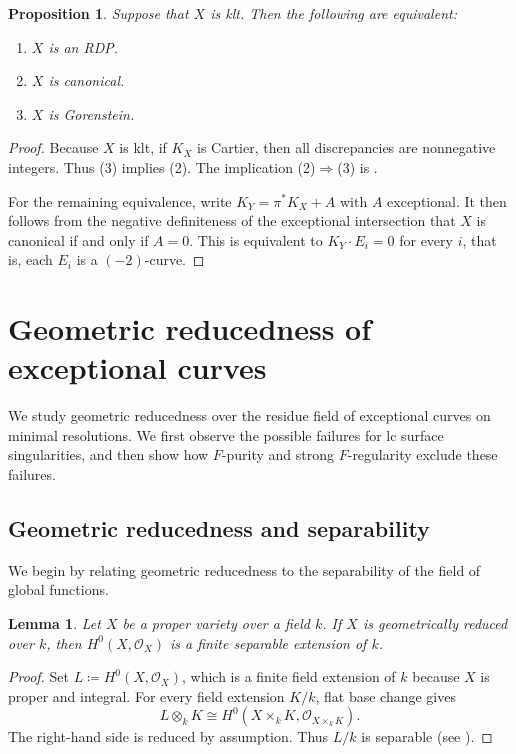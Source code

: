\documentclass[12pt]{amsart}
\newcommand{\sO}{\mathcal{O}}
\theoremstyle{plain}
\newtheorem{prop}[thm]{Proposition}
\newtheorem{lem}[thm]{Lemma}
\theoremstyle{definition}
\theoremstyle{remark}
\newtheorem{defn and notation}[thm]{Definition and Notation}
\theoremstyle{plain}
\numberwithin{equation}{thm}
\begin{document}
\begin{prop}\label{prop:RDP}
    Suppose that $X$ is klt.
    Then the following are equivalent:
    \begin{enumerate}
        \item[\textup{(1)}] $X$ is an RDP.
        \item[\textup{(2)}] $X$ is canonical.
        \item[\textup{(3)}] $X$ is Gorenstein.
    \end{enumerate}
\end{prop}
\begin{proof}
Because $X$ is klt, if $K_X$ is Cartier, then all discrepancies are nonnegative integers. Thus (3) implies (2).
The implication (2)$\Rightarrow$(3) is \cite[Proposition 3.9]{Sato-Takagi(generalhyperplane)}.

For the remaining equivalence, write $K_Y=\pi^*K_X+A$ with $A$ exceptional.
It then follows from the negative definiteness of the exceptional intersection that $X$ is canonical if and only if $A = 0$.
This is equivalent to $K_Y\cdot E_i=0$ for every $i$, that is, each $E_i$ is a $(-2)$-curve.
\end{proof}






\section{Geometric reducedness of exceptional curves}\label{sec:geometric-reducedness}
We study geometric reducedness over the residue field of exceptional curves on minimal resolutions. We first observe the possible failures for lc surface singularities, and then show how $F$-purity and strong $F$-regularity exclude these failures.

\subsection{Geometric reducedness and separability}\label{subsec:geom red}

We begin by relating geometric reducedness to the separability of the field of global functions.

\begin{lem}\label{lem:geom.red to separable}
    Let $X$ be a proper variety over a field $k$.
    If $X$ is geometrically reduced over $k$, then $H^0(X, \sO_X)$ is a finite separable extension of $k$.
\end{lem}
\begin{proof}
    Set $L\coloneqq H^0(X,\sO_X)$, which is a finite field extension of $k$ because $X$ is proper and integral.
    For every field extension $K/k$, flat base change gives
    \[
    L\otimes_k K\cong H^0(X\times_k K,\sO_{X\times_k K}).
    \]
    The right-hand side is reduced by assumption. Thus $L/k$ is separable (see \cite[Section 26]{Matsumura}).
\end{proof}
\end{document}
